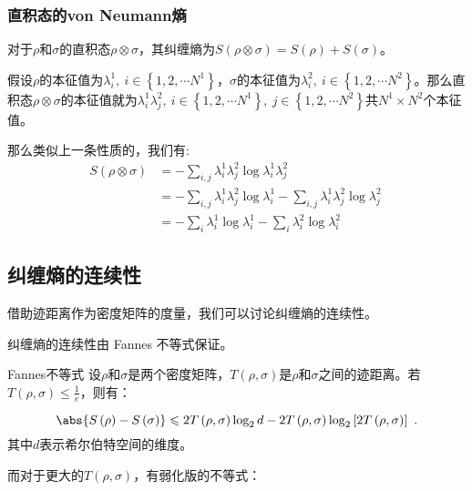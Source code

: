 \subsubsection{直积态的von Neumann熵}

对于$\rho$和$\sigma$的直积态$\rho\otimes\sigma$，其纠缠熵为$S\left(\rho\otimes \sigma\right) = S\left(\rho\right) + S\left(\sigma\right)$。

假设$\rho$的本征值为$\lambda_i^1,~i\in \left\{1,2,\cdots N^1\right\}$，$\sigma$的本征值为$\lambda_i^2,~i \in \left\{1,2,\cdots N^2\right\}$。那么直积态$\rho\otimes \sigma$的本征值就为$\lambda_i^1\lambda_j^2,~i\in\left\{1,2,\cdots N^1\right\},~j\in\left\{1,2,\cdots N^2\right\}$共$N^1\times N^2$个本征值。

那么类似上一条性质的，我们有:
\begin{equation}
\begin{aligned}
S\left(\rho\otimes\sigma\right) &= -\sum_{i,j}\lambda_i^1\lambda_j^2\log\lambda_i^1\lambda_j^2 \\
&= -\sum_{i,j}\lambda_i^1\lambda_j^2\log\lambda_i^1 - \sum_{i,j}\lambda_i^1\lambda_j^2\log\lambda_j^2 \\
&= -\sum_i \lambda_i^1\log\lambda_i^1 - \sum_i\lambda_i^2\log\lambda_i^2
\end{aligned}~
\end{equation}



\subsection{纠缠熵的连续性}

借助迹距离作为密度矩阵的度量，我们可以讨论纠缠熵的连续性。

纠缠熵的连续性由 Fannes 不等式保证。

\begin{theorem}{Fannes不等式}
设$\rho$和$\sigma$是两个密度矩阵，$T\left(\rho,\sigma\right)$是$\rho$和$\sigma$之间的迹距离。若$T\left(\rho,\sigma\right) \leqslant \frac{1}{e}$，则有：

\begin{equation}
\abs{S\left(\rho\right) - S\left(\sigma\right)} \leqslant 2T\left(\rho,\sigma\right)\log_2 d - 2T\left(\rho,\sigma\right) \log_2\left[ 2 T\left(\rho,\sigma\right)\right]~.
\end{equation}
其中$d$表示希尔伯特空间的维度。

\end{theorem}

而对于更大的$T\left(\rho,\sigma\right)$，有弱化版的不等式：


